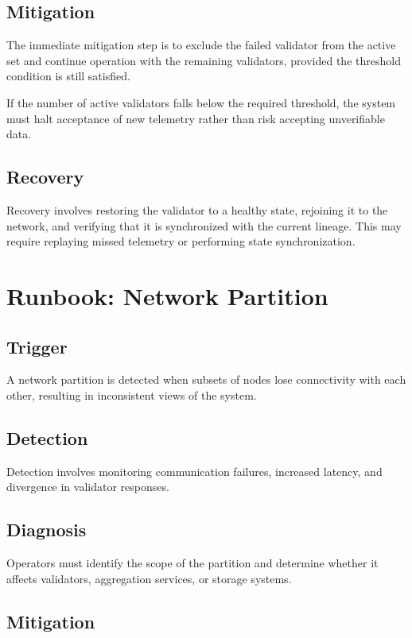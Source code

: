 \subsection{Mitigation}

The immediate mitigation step is to exclude the failed validator from the active set and continue operation with the remaining validators, provided the threshold condition is still satisfied.

If the number of active validators falls below the required threshold, the system must halt acceptance of new telemetry rather than risk accepting unverifiable data.

\subsection{Recovery}

Recovery involves restoring the validator to a healthy state, rejoining it to the network, and verifying that it is synchronized with the current lineage. This may require replaying missed telemetry or performing state synchronization.

\section{Runbook: Network Partition}

\subsection{Trigger}

A network partition is detected when subsets of nodes lose connectivity with each other, resulting in inconsistent views of the system.

\subsection{Detection}

Detection involves monitoring communication failures, increased latency, and divergence in validator responses.

\subsection{Diagnosis}

Operators must identify the scope of the partition and determine whether it affects validators, aggregation services, or storage systems.

\subsection{Mitigation}

